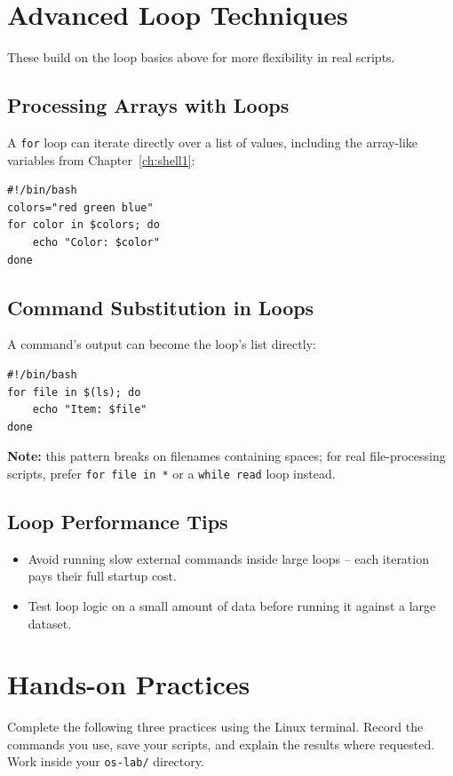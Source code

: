 \section{Advanced Loop Techniques}
These build on the loop basics above for more flexibility in real scripts.

\subsection{Processing Arrays with Loops}
A \texttt{for} loop can iterate directly over a list of values, including the array-like variables from Chapter~\ref{ch:shell1}:
\begin{lstlisting}[language=Terminal]
#!/bin/bash
colors="red green blue"
for color in $colors; do
    echo "Color: $color"
done
\end{lstlisting}

\subsection{Command Substitution in Loops}
A command's output can become the loop's list directly:
\begin{lstlisting}[language=Terminal]
#!/bin/bash
for file in $(ls); do
    echo "Item: $file"
done
\end{lstlisting}
\textbf{Note:} this pattern breaks on filenames containing spaces; for real file-processing scripts, prefer \texttt{for file in *} or a \texttt{while read} loop instead.

\subsection{Loop Performance Tips}
\begin{itemize}
    \item Avoid running slow external commands inside large loops -- each iteration pays their full startup cost.
    \item Test loop logic on a small amount of data before running it against a large dataset.
\end{itemize}



\section{Hands-on Practices}
Complete the following three practices using the Linux terminal. Record the commands you use, save your scripts, and explain the results where requested. Work inside your \texttt{os-lab/} directory.


